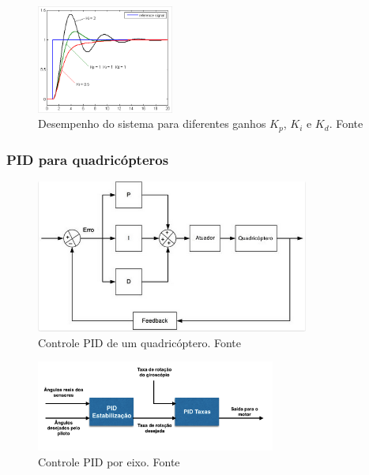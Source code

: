 \documentclass{beamer}
\begin{document}
\begin{frame}[allowframebreaks]
\begin{itemize}
		\vspace{0.6cm}
		\begin{figure}[h]
			\centering
			\includegraphics[keepaspectratio = true,
			width=0.4\textwidth]{img/ganho_PID.png}
			\caption{Desempenho do sistema para diferentes ganhos $K_p$, $K_i$ e $K_d$. Fonte \cite{Kingdom}}
			\label{fig:ganhoPID}
		\end{figure}	
	
	\end{itemize}
	
\end{frame}	

\begin{frame}[allowframebreaks]
	
	\frametitle{PID para quadricópteros}
	
	\begin{figure}[h]
		\centering
		\includegraphics[keepaspectratio = true,
		width=0.8\textwidth]{img/PID_quad_geral.png}
		\caption{Controle PID de um quadricóptero. Fonte \cite{Liang}}
		\label{fig:PIDquad}
	\end{figure}
	
	\framebreak
	
	\begin{figure}[h]
		\centering
		\includegraphics[keepaspectratio = true,
		width=0.7\textwidth]{img/PID_quad_axis.png}
		\caption{Controle PID por eixo. Fonte \cite{Liang}}
		\label{fig:PIDaxis}
	\end{figure}
	
	
\end{frame}	
\end{document}
